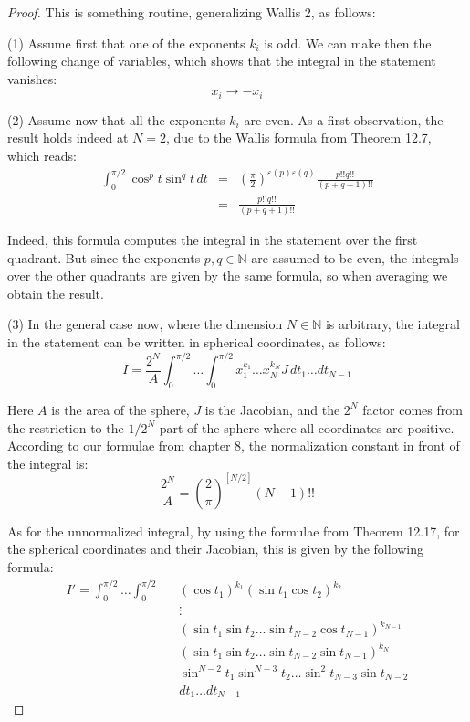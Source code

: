 \documentclass[12pt]{amsbook}
\begin{document}
\begin{proof}
This is something routine, generalizing Wallis 2, as follows:

\medskip

(1) Assume first that one of the exponents $k_i$ is odd. We can make then the following change of variables, which shows that the integral in the statement vanishes:
$$x_i\to-x_i$$

(2) Assume now that all the exponents $k_i$ are even. As a first observation, the result holds indeed at $N=2$, due to the Wallis formula from Theorem 12.7, which reads:
\begin{eqnarray*}
\int_0^{\pi/2}\cos^pt\sin^qt\,dt
&=&\left(\frac{\pi}{2}\right)^{\varepsilon(p)\varepsilon(q)}\frac{p!!q!!}{(p+q+1)!!}\\\
&=&\frac{p!!q!!}{(p+q+1)!!}
\end{eqnarray*}

Indeed, this formula computes the integral in the statement over the first quadrant. But since the exponents $p,q\in\mathbb N$ are assumed to be even, the integrals over the other quadrants are given by the same formula, so when averaging we obtain the result. 

\medskip

(3) In the general case now, where the dimension $N\in\mathbb N$ is arbitrary, the integral in the statement can be written in spherical coordinates, as follows:
$$I=\frac{2^N}{A}\int_0^{\pi/2}\ldots\int_0^{\pi/2}x_1^{k_1}\ldots x_N^{k_N}J\,dt_1\ldots dt_{N-1}$$

Here $A$ is the area of the sphere, $J$ is the Jacobian, and the $2^N$ factor comes from the restriction to the $1/2^N$ part of the sphere where all coordinates are positive. According to our formulae from chapter 8, the normalization constant in front of the integral is:
$$\frac{2^N}{A}=\left(\frac{2}{\pi}\right)^{[N/2]}(N-1)!!$$

As for the unnormalized integral, by using the formulae from Theorem 12.17, for the spherical coordinates and their Jacobian, this is given by the following formula:
\begin{eqnarray*}
I'=\int_0^{\pi/2}\ldots\int_0^{\pi/2}
&&(\cos t_1)^{k_1}
(\sin t_1\cos t_2)^{k_2}\\
&&\vdots\\
&&(\sin t_1\sin t_2\ldots\sin t_{N-2}\cos t_{N-1})^{k_{N-1}}\\
&&(\sin t_1\sin t_2\ldots\sin t_{N-2}\sin t_{N-1})^{k_N}\\
&&\sin^{N-2}t_1\sin^{N-3}t_2\ldots\sin^2t_{N-3}\sin t_{N-2}\\
&&dt_1\ldots dt_{N-1}
\end{eqnarray*}


\end{proof}
\end{document}
